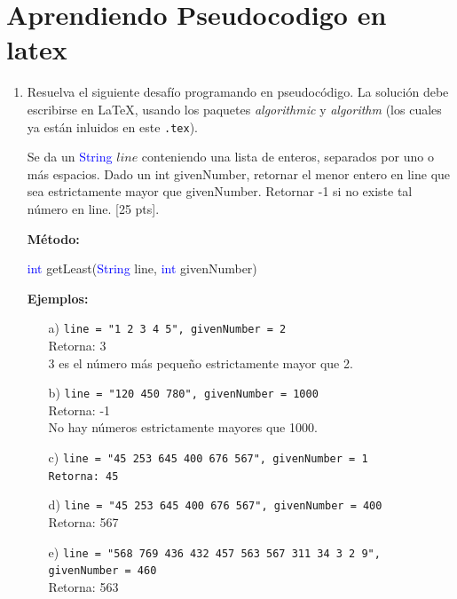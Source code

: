 \documentclass[letterpaper,10pt]{article}
\begin{document}
\section{Aprendiendo Pseudocodigo en latex}
\begin{enumerate}
    \item Resuelva el siguiente desafío programando en pseudocódigo. La solución debe escribirse en \LaTeX, usando los paquetes \textit{algorithmic} y \textit{algorithm} (los cuales ya están inluidos en este \texttt{.tex}).

Se da un \textcolor{blue}{String} $line$ conteniendo una lista de enteros, separados por uno o más espacios. Dado un int givenNumber, retornar el menor entero en line que sea estrictamente mayor que givenNumber. Retornar -1 si no existe tal número en line. [25 pts].
\vspace{0.5cm}

\textbf{Método:}
\begin{center}
    \textcolor{blue}{int} getLeast(\textcolor{blue}{String} line, \textcolor{blue}{int} givenNumber)
\end{center}

\textbf{Ejemplos:}
\vspace{0.5cm}

\begin{enumerate}
    \item[a)] \texttt{line = "1 2 3 4 5", givenNumber = 2}\\ Retorna: 3\\ 3 es el número más pequeño estrictamente mayor que 2.
    \item[b)] \texttt{line = "120 450 780", givenNumber = 1000}\\Retorna: -1\\No hay números estrictamente mayores que 1000.
    \item[c)] \texttt{line = "45 253 645 400 676 567", givenNumber = 1\\
Retorna: 45}
    \item[d)] \texttt{line = "45 253 645 400 676 567", givenNumber = 400}\\
Retorna: 567
    \item[e)] \texttt{line = "568 769 436 432 457 563 567 311 34 3 2 9", givenNumber = 460}\\
Retorna: 563
\end{enumerate}

\vspace{0.5cm}




\end{enumerate}
\end{document}
